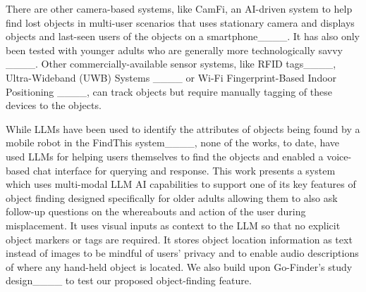 There are other camera-based systems, like CamFi, an AI-driven system to help find lost objects in multi-user scenarios that uses stationary camera and displays objects and last-seen users of the objects on a smartphone____. It has also only been tested with younger adults who are generally more technologically savvy ____. 
Other commercially-available sensor systems, like RFID tags____, Ultra-Wideband (UWB) Systems ____ or Wi-Fi Fingerprint-Based Indoor Positioning ____, can track objects but require manually tagging of these devices to the objects.


While LLMs have been used to identify the attributes of objects being found by a mobile robot in the FindThis system____, none of the works, to date, have used LLMs for helping users themselves to find the objects and enabled a voice-based chat interface for querying and response. This work presents a system which uses multi-modal LLM AI capabilities to support one of its key features of object finding designed specifically for older adults allowing them to also ask follow-up questions on the whereabouts and action of the user during misplacement. It uses visual inputs as context to the LLM so that no explicit object markers or tags are required. It stores object location information as text instead of images to be mindful of users' privacy and to enable audio descriptions of where any hand-held object is located. We also build upon Go-Finder's study design____ to test our proposed object-finding feature.






